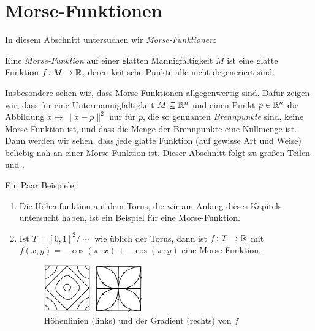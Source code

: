 \section{Morse-Funktionen}

In diesem Abschnitt untersuchen wir \textit{Morse-Funktionen}:

\begin{definition}
    \label{satz: morse-funktion}
    Eine \textit{Morse-Funktion} auf einer glatten Mannigfaltigkeit $M$ ist eine glatte Funktion
    $f \colon M \to { \mathbb R }$, deren kritische Punkte alle nicht degeneriert sind.
\end{definition}

Insbesondere sehen wir, dass Morse-Funktionen allgegenwertig sind. Dafür zeigen wir, dass für 
eine Untermannigfaltigkeit $M \subseteq { \mathbb R }^n$ und einen Punkt $p \in { \mathbb R }^n$ die Abbildung
$x \mapsto \| x - p \|^2$ nur für $p$, die so gennanten \textit{Brennpunkte}
sind, keine Morse Funktion ist, und dass die Menge der Brennpunkte eine Nullmenge ist. Dann werden
wir sehen, dass jede glatte Funktion (auf gewisse Art und Weise) beliebig nah an einer Morse 
Funktion ist. Dieser Abschnitt folgt zu großen Teilen \cite{milnor} und \cite{audin}.

\begin{example}
    \label{bsp: morse funktion}
    Ein Paar Beispiele:
    \begin{enumerate}
        \item Die Höhenfunktion auf dem Torus, die wir am Anfang dieses Kapitels untersucht haben, ist 
            ein Beispiel für eine Morse-Funktion.
        \item Ist $T = [0, 1]^2 / \sim$ wie üblich der Torus, dann ist $f \colon T \to { \mathbb R }$ mit 
            $f(x, y) = -\cos(\pi \cdot x) + -\cos(\pi \cdot y)$ eine Morse Funktion. 
            \begin{figure}[H]
                \centering
                \includegraphics[width=0.4\textwidth]{../resources/morse-funktion-torus.jpeg}
                \caption{Höhenlinien (links) und der Gradient (rechts) von $f$}
            \end{figure}
    \end{enumerate}
\end{example}

